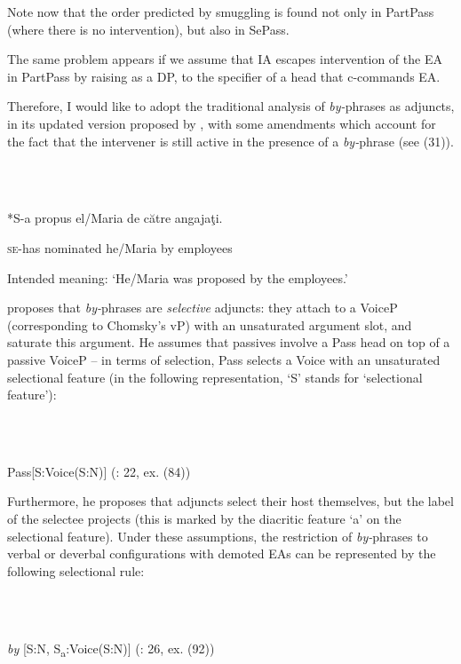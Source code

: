\documentclass[output=paper]{langsci/langscibook}
\begin{document}
Note now that the order predicted by smuggling is found not only in PartPass (where there is no intervention), but also in SePass. 

  The same problem appears if we assume that IA escapes intervention of the EA in PartPass by raising as a DP, to the specifier of a head that c-commands EA.

  Therefore, I would like to adopt the traditional analysis of \textit{by-}phrases as adjuncts, in its updated version proposed by \citet{Bruening2012}, with some amendments which account for the fact that the intervener is still active in the presence of a \textit{by-}phrase (see (31)).

\ea%
    \label{ex:key:31}
    \gll\\
        \\
    \glt
    \z

          *S-a     propus       el/Maria  de către angajaţi.

 \textsc{se-}has nominated he/Maria by          employees

Intended meaning: ‘He/Maria was proposed by the employees.’

\citet{Bruening2012} proposes that \textit{by-}phrases are \textit{selective} adjuncts: they attach to a VoiceP (corresponding to Chomsky’s vP) with an unsaturated argument slot, and saturate this argument. He assumes that passives involve a Pass head on top of a passive VoiceP – in terms of selection, Pass selects a Voice with an unsaturated selectional feature (in the following representation, ‘S’ stands for ‘selectional feature’):

\ea%
    \label{ex:key:32}
    \gll\\
        \\
    \glt
    \z

          Pass[S:Voice(S:N)]  (\citealt{Bruening2012}: 22, ex. (84))

Furthermore, he proposes that adjuncts select their host themselves, but the label of the selectee projects (this is marked by the diacritic feature ‘a’ on the selectional feature). Under these assumptions, the restriction of \textit{by-}phrases to verbal or deverbal configurations with demoted EAs can be represented by the following selectional rule:

\ea%
    \label{ex:key:33}
    \gll\\
        \\
    \glt
    \z

          \textit{by} [S:N, S\textsubscript{a}:Voice(S:N)]  (\citealt{Bruening2012}: 26, ex. (92))
\end{document}
